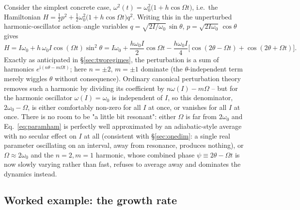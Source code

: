 \documentclass[11pt]{book}
\newcommand{\ii}{\mathrm{i}}
\begin{document}
Consider the simplest concrete case, $\omega^2(t) = \omega_0^2\big(1+h\cos\Omega t\big)$, i.e.\ the
Hamiltonian $H = \tfrac12 p^2 + \tfrac12\omega_0^2\big(1+h\cos\Omega t\big)q^2$. Writing this in the
unperturbed harmonic-oscillator action--angle variables $q=\sqrt{2I/\omega_0}\,\sin\theta$,
$p=\sqrt{2I\omega_0}\,\cos\theta$ gives
\begin{equation}
H = I\omega_0 + h\,\omega_0 I\cos(\Omega t)\sin^2\theta
= I\omega_0 + \frac{h\omega_0 I}{2}\cos\Omega t - \frac{h\omega_0 I}{4}\Big[\cos(2\theta-\Omega t)
+ \cos(2\theta+\Omega t)\Big].
\label{eq:paramham}
\end{equation}
Exactly as anticipated in \S\ref{sec:tworegimes}, the perturbation is a sum of harmonics
$e^{\ii(n\theta - m\Omega t)}$; here $n=\pm2$, $m=\pm1$ dominate (the $\theta$-independent term
merely wiggles $\theta$ without consequence). Ordinary canonical perturbation theory removes such a
harmonic by dividing its coefficient by $n\omega(I)-m\Omega$ -- but for the harmonic oscillator
$\omega(I)=\omega_0$ is independent of $I$, so this denominator, $2\omega_0-\Omega$, is either
comfortably non-zero for all $I$ at once, or vanishes for all $I$ at once. There is no room to be
"a little bit resonant": either $\Omega$ is far from $2\omega_0$ and Eq.~\eqref{eq:paramham} is
perfectly well approximated by an adiabatic-style average with no secular effect on $I$ at all
(consistent with \S\ref{sec:onedim}: a single real parameter oscillating on an interval, away from
resonance, produces nothing), or $\Omega\approx 2\omega_0$ and the $n=2,m=1$ harmonic, whose
combined phase $\psi \equiv 2\theta - \Omega t$ is now slowly varying rather than fast, refuses to
average away and dominates the dynamics instead.

\subsection{Worked example: the growth rate}
\label{sec:growthrate}
\end{document}
